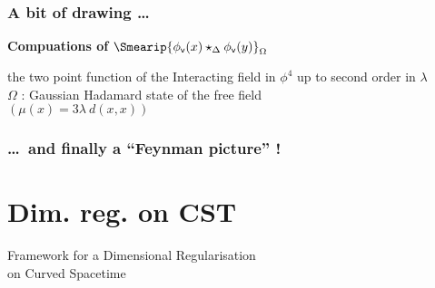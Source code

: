 \documentclass[9pt]{beamer}
\newcommand{\vsf}{\mathsf{v}}
\begin{document}
\begin{frame}
 
\frametitle{A bit of drawing \dots }

\vfill

\textbf{Compuations of} $\Smearip{\phi_\vsf(x) \star_\Delta \phi_\vsf(y)}_\Omega$ \\

\vfill

the two point function of the Interacting field in $\phi^4$ up to second order in $\lambda$ \\[3pt]
$\Omega$ : Gaussian Hadamard state of the free field \\[3pt]
$(\mu(x) = 3 \lambda \ d(x, x))$

\vfill

\begin{figure}[h!]
 \centering
\end{figure}

\vfill

\end{frame}


\begin{frame}
 
\frametitle{ \dots \ and finally a ``Feynman picture'' ! }

\vfill

\begin{figure}[h!]
 \centering
\end{figure}

\vfill

\end{frame}

\section{Dim. reg. on CST}

{
\begin{frame}
\bf
\begin{exampleblock}{\vspace*{-3ex}}
\begin{center}
\Large Framework for a Dimensional Regularisation \\[10pt] on Curved Spacetime
\end{center}
\end{exampleblock}
\end{frame}
}
\end{document}

